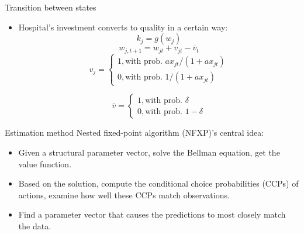 \documentclass[aspectratio=169]{beamer}  %
\begin{document}
\begin{frame}{Transition between states}
    \begin{itemize}
        \item  Hospital's investment converts to quality in a certain way: \\
        \[
        k_j=g(w_j)
        \]
        \[
         w_{j,t+1}=w_{jt}+v_{jt}-\bar v_t
        \]
        \begin{equation*}  
        v_j=\left\{  
        \begin{array}{lr}  
        1, \text{with prob.  } ax_{jt}/(1+ax_{jt}) \\
        0, \text{with prob.  } 1/(1+ax_{jt})    
        \end{array}  
        \right.  
        \end{equation*}
        
        \begin{equation*}  
        \bar v=\left\{  
        \begin{array}{lr}  
        1, \text{with prob.  } \delta  \\
        0, \text{with prob.  } 1-\delta   
        \end{array}  
        \right.  
        \end{equation*}
        
    \end{itemize}
\end{frame}

\begin{frame}{Estimation method}
   Nested fixed-point algorithm (NFXP)'s central idea:
    \begin{itemize}
        \item Given a structural parameter vector, solve the Bellman equation, get the value function.
        \item Based on the solution, compute the conditional choice probabilities (CCPs) of actions, examine how well these CCPs match observations.
        \item Find a parameter vector that causes the predictions to most closely match the data.
        
    \end{itemize}
\end{frame}
\end{document}
